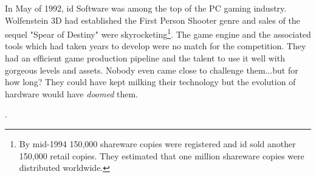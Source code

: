 In May of 1992, id Software was among the top of the PC gaming industry. Wolfenstein 3D had established the First
Person Shooter genre and sales of the sequel "Spear of Destiny" were skyrocketing\footnote{By mid-1994 150,000 shareware copies were registered and id sold another 150,000 retail copies. They estimated that one million shareware copies were distributed worldwide.}. The game engine and the associated 
tools which had taken years to develop were no match for the competition. They had an efficient game production pipeline and the talent to use it well with gorgeous levels and assets. Nobody even came close to challenge them...but for how long? They could have kept milking their technology but the evolution of hardware would have \textit{doomed} them.\\
\par

\par
{}. \\
\par


